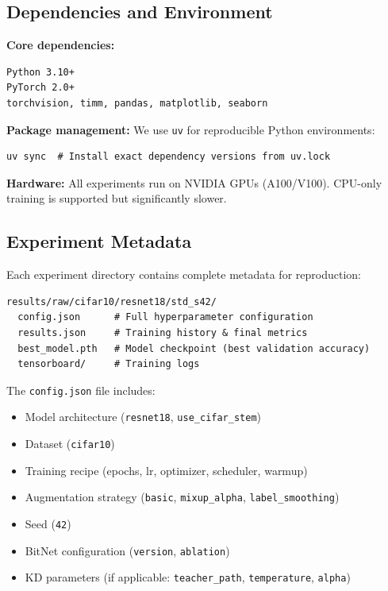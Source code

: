 \subsection{Dependencies and Environment}

\textbf{Core dependencies:}
\begin{verbatim}
Python 3.10+
PyTorch 2.0+
torchvision, timm, pandas, matplotlib, seaborn
\end{verbatim}

\textbf{Package management:} We use \texttt{uv} for reproducible Python environments:
\begin{verbatim}
uv sync  # Install exact dependency versions from uv.lock
\end{verbatim}

\textbf{Hardware:} All experiments run on NVIDIA GPUs (A100/V100). CPU-only training is supported but significantly slower.

\subsection{Experiment Metadata}

Each experiment directory contains complete metadata for reproduction:

\begin{verbatim}
results/raw/cifar10/resnet18/std_s42/
  config.json      # Full hyperparameter configuration
  results.json     # Training history & final metrics
  best_model.pth   # Model checkpoint (best validation accuracy)
  tensorboard/     # Training logs
\end{verbatim}

The \texttt{config.json} file includes:
\begin{itemize}
    \item Model architecture (\texttt{resnet18}, \texttt{use\_cifar\_stem})
    \item Dataset (\texttt{cifar10})
    \item Training recipe (epochs, lr, optimizer, scheduler, warmup)
    \item Augmentation strategy (\texttt{basic}, \texttt{mixup\_alpha}, \texttt{label\_smoothing})
    \item Seed (\texttt{42})
    \item BitNet configuration (\texttt{version}, \texttt{ablation})
    \item KD parameters (if applicable: \texttt{teacher\_path}, \texttt{temperature}, \texttt{alpha})
\end{itemize}


